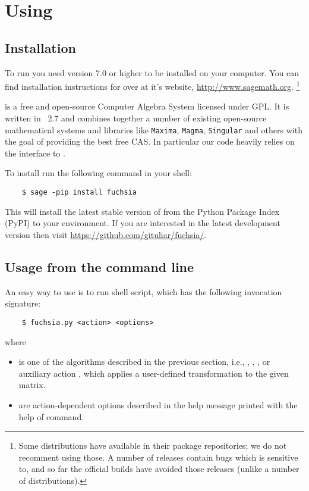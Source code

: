 \documentclass[12pt,a4paper]{article}
\begin{document}
\section{Using \fuchsia}
\label{sec:3}

\subsection{Installation}

To run \fuchsia you need \sage version 7.0 or higher to be installed on your computer.
You can find installation instructions for \sage over at it's website, \url{http://www.sagemath.org}.
\footnote{
    Some \linux distributions have \sage available in their package repositories; we do not recomment using those.
    A number of \maxima releases contain bugs which \fuchsia is sensitive to, and so far the official \sage builds have avoided those releases (unlike a number of \linux distributions).
}

\sage is a free and open-source Computer Algebra System licensed under GPL.
It is written in \python~2.7 and combines together a number of existing open-source mathematical systems and libraries like \texttt{Maxima}, \texttt{Magma}, \texttt{Singular} and others with the goal of providing the best free CAS.
In particular our code heavily relies on the interface to \maxima.

To install \fuchsia run the following command in your shell:

\begin{verbatim}
    $ sage -pip install fuchsia
\end{verbatim}

This will install the latest stable version of \fuchsia from the Python Package Index (PyPI) to your \sage environment.
If you are interested in the latest development version then visit \url{https://github.com/gituliar/fuchsia/}.

\subsection{Usage from the command line}

An easy way to use \fuchsia is to run  shell script, which has the following invocation signature:

\begin{verbatim}
    $ fuchsia.py <action> <options>
\end{verbatim}

where
\begin{itemize}
  \item {} is one of the algorithms described in the previous section, i.e., , , , or auxiliary action , which applies a user-defined transformation to the given matrix.
  \item {} are action-dependent options described in the help message printed with the help of  command.
\end{itemize}
\end{document}
